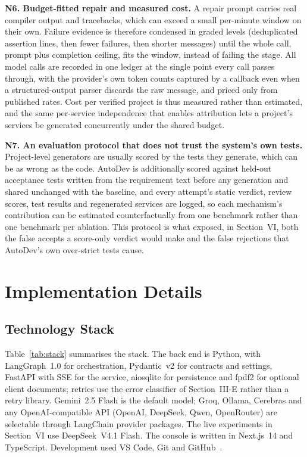 \documentclass[conference,letterpaper]{IEEEtran}
\begin{document}
\textbf{N6. Budget-fitted repair and measured cost.} A repair prompt carries real
compiler output and tracebacks, which can exceed a small per-minute window on
their own. Failure evidence is therefore condensed in graded levels (deduplicated
assertion lines, then fewer failures, then shorter messages) until the whole call,
prompt plus completion ceiling, fits the window, instead of failing the stage. All
model calls are recorded in one ledger at the single point every call passes
through, with the provider's own token counts captured by a callback even when a
structured-output parser discards the raw message, and priced only from published
rates. Cost per verified project is thus measured rather than estimated, and the
same per-service independence that enables attribution lets a project's services
be generated concurrently under the shared budget.

\textbf{N7. An evaluation protocol that does not trust the system's own tests.}
Project-level generators are usually scored by the tests they generate, which
can be as wrong as the code. AutoDev is additionally scored against held-out
acceptance tests written from the requirement text before any generation and
shared unchanged with the baseline, and every attempt's static verdict, review
scores, test results and regenerated services are logged, so each mechanism's
contribution can be estimated counterfactually from one benchmark rather than
one benchmark per ablation. This protocol is what exposed, in Section~VI, both
the false accepts a score-only verdict would make and the false rejections that
AutoDev's own over-strict tests cause.

\section{Implementation Details}

\subsection{Technology Stack}
Table~\ref{tab:stack} summarises the stack. The back end is Python, with
LangGraph~1.0 for orchestration, Pydantic~v2 for contracts and settings, FastAPI
with SSE for the service, aiosqlite for persistence and fpdf2 for optional
client documents; retries use the error classifier of Section~III-E rather than a
retry library. Gemini~2.5 Flash is the default model; Groq, Ollama, Cerebras and
any OpenAI-compatible API (OpenAI, DeepSeek, Qwen, OpenRouter) are selectable
through LangChain provider packages. The live experiments in Section~VI use
DeepSeek~V4.1 Flash. The console is written in Next.js~14 and TypeScript. Development used VS Code, Git
and GitHub~\cite{autodevrepo}.
\end{document}
